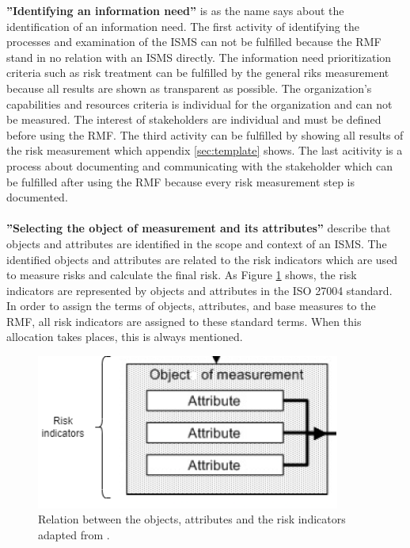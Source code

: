 \textbf{''Identifying an information need''} is as the name says about the identification of an information need. The first activity of identifying the processes and examination of the ISMS can not be fulfilled because the RMF stand in no relation with an ISMS directly. The information need prioritization criteria such as risk treatment can be fulfilled by the general riks measurement because all results are shown as transparent as possible. The organization's capabilities and resources criteria is individual for the organization and can not be measured. The interest of stakeholders are individual and must be defined before using the RMF. The third activity can be fulfilled by showing all results of the risk measurement which appendix \ref{sec:template} shows. The last acitivity is a process about documenting and communicating with the stakeholder which can be fulfilled after using the RMF because every risk measurement step is documented. \\ \\

\textbf{''Selecting the object of measurement and its attributes''} describe that objects and attributes are identified in the scope and context of an ISMS. The identified objects and attributes are related to the risk indicators which are used to measure risks and calculate the final risk. As Figure \ref{fig:relation_risk_ind} shows, the risk indicators are represented by objects and attributes in the ISO 27004 \cite{ISO_27004_2009} standard. In order to assign the terms of objects, attributes, and base measures to the RMF, all risk indicators are assigned to these standard terms. When this allocation takes places, this is always mentioned.

\begin{figure}[ht!]
  \centering
  \includegraphics[width=10cm]{pictures/relation_risk_ind.png}
  \caption{Relation between the objects, attributes and the risk indicators adapted from \cite{ISO_27004_2009}.}
  \label{fig:relation_risk_ind}
\end{figure}

